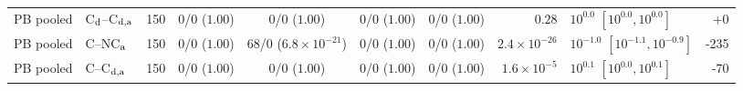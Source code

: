 \begin{tabular}{@{}llr cccc r l r@{}}
PB pooled & C$_{\rm d}$--C$_{\rm d,a}$ & 150 & 0/0 ($1.00$) & 0/0 ($1.00$) & 0/0 ($1.00$) & 0/0 ($1.00$) & $0.28$ & $10^{0.0}$ $[10^{0.0},10^{0.0}]$ & +0\\
PB pooled & C--NC$_{\rm a}$ & 150 & 0/0 ($1.00$) & 68/0 ($6.8\times10^{-21}$) & 0/0 ($1.00$) & 0/0 ($1.00$) & $2.4\times10^{-26}$ & $10^{-1.0}$ $[10^{-1.1},10^{-0.9}]$ & -235\\
PB pooled & C--C$_{\rm d,a}$ & 150 & 0/0 ($1.00$) & 0/0 ($1.00$) & 0/0 ($1.00$) & 0/0 ($1.00$) & $1.6\times10^{-5}$ & $10^{0.1}$ $[10^{0.0},10^{0.1}]$ & -70\\
\bottomrule
\end{tabular}
